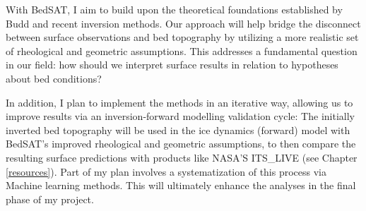 With BedSAT, I aim to build upon the theoretical foundations established by Budd and recent inversion methods. Our approach will help bridge the disconnect between surface observations and bed topography by utilizing a more realistic set of rheological and geometric assumptions.  This addresses a fundamental question in our field: how should we interpret surface results in relation to hypotheses about bed conditions? 

In addition, I plan to implement the methods in an iterative way, allowing us to improve results via an inversion-forward modelling validation cycle: The initially inverted bed topography will be used in the ice dynamics (forward) model with BedSAT's improved rheological and geometric assumptions, to then compare the resulting surface predictions with products like NASA'S ITS\_LIVE (see Chapter \ref{resources}). Part of my plan involves a systematization of this process via Machine learning methods. This will ultimately enhance the analyses in the final phase of my project.
